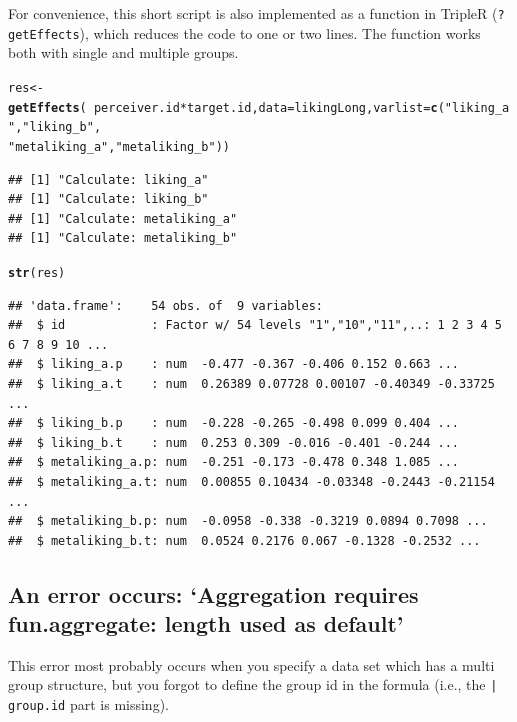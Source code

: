 \documentclass[a4paper]{article}\usepackage[]{graphicx}\usepackage[]{color}
\makeatletter
\newcommand{\hlstr}[1]{\textcolor[rgb]{0.192,0.494,0.8}{#1}}%
\newcommand{\hlopt}[1]{\textcolor[rgb]{0,0,0}{#1}}%
\newcommand{\hlstd}[1]{\textcolor[rgb]{0.345,0.345,0.345}{#1}}%
\newcommand{\hlkwb}[1]{\textcolor[rgb]{0.69,0.353,0.396}{#1}}%
\newcommand{\hlkwc}[1]{\textcolor[rgb]{0.333,0.667,0.333}{#1}}%
\newcommand{\hlkwd}[1]{\textcolor[rgb]{0.737,0.353,0.396}{\textbf{#1}}}%
\newenvironment{kframe}{%
 \def\at@end@of@kframe{}%
 \ifinner\ifhmode%
  \def\at@end@of@kframe{\end{minipage}}%
  \begin{minipage}{\columnwidth}%
 \fi\fi%
 \def\FrameCommand##1{\hskip\@totalleftmargin \hskip-\fboxsep
 \colorbox{shadecolor}{##1}\hskip-\fboxsep
     \hskip-\linewidth \hskip-\@totalleftmargin \hskip\columnwidth}%
 \MakeFramed {\advance\hsize-\width
   \@totalleftmargin\z@ \linewidth\hsize
   \@setminipage}}%
 {\par\unskip\endMakeFramed%
 \at@end@of@kframe}
\newenvironment{knitrout}{}{} %
\makeatother
\begin{document}
For convenience, this short script is also implemented as a function in TripleR (\texttt{?getEffects}), which reduces the code to one or two lines. The function works both with single and multiple groups.

\begin{knitrout}\small
{}\color{fgcolor}\begin{kframe}
\begin{alltt}
\hlstd{res} \hlkwb{<-} \hlkwd{getEffects}\hlstd{(}\hlopt{~}\hlstd{perceiver.id} \hlopt{*} \hlstd{target.id,} \hlkwc{data} \hlstd{= likingLong,} \hlkwc{varlist} \hlstd{=} \hlkwd{c}\hlstd{(}\hlstr{"liking_a"}\hlstd{,} \hlstr{"liking_b"}\hlstd{,}
    \hlstr{"metaliking_a"}\hlstd{,} \hlstr{"metaliking_b"}\hlstd{))}
\end{alltt}
\begin{verbatim}
## [1] "Calculate: liking_a"
## [1] "Calculate: liking_b"
## [1] "Calculate: metaliking_a"
## [1] "Calculate: metaliking_b"
\end{verbatim}
\begin{alltt}
\hlkwd{str}\hlstd{(res)}
\end{alltt}
\begin{verbatim}
## 'data.frame':	54 obs. of  9 variables:
##  $ id            : Factor w/ 54 levels "1","10","11",..: 1 2 3 4 5 6 7 8 9 10 ...
##  $ liking_a.p    : num  -0.477 -0.367 -0.406 0.152 0.663 ...
##  $ liking_a.t    : num  0.26389 0.07728 0.00107 -0.40349 -0.33725 ...
##  $ liking_b.p    : num  -0.228 -0.265 -0.498 0.099 0.404 ...
##  $ liking_b.t    : num  0.253 0.309 -0.016 -0.401 -0.244 ...
##  $ metaliking_a.p: num  -0.251 -0.173 -0.478 0.348 1.085 ...
##  $ metaliking_a.t: num  0.00855 0.10434 -0.03348 -0.2443 -0.21154 ...
##  $ metaliking_b.p: num  -0.0958 -0.338 -0.3219 0.0894 0.7098 ...
##  $ metaliking_b.t: num  0.0524 0.2176 0.067 -0.1328 -0.2532 ...
\end{verbatim}
\end{kframe}
\end{knitrout}







\subsection{An error occurs: `Aggregation requires fun.aggregate: length used as default'} %
\label{sub:an_error_occurs_aggregation_requires_fun_aggregate_length_used_as_default_}
This error most probably occurs when you specify a data set which has a multi group structure, but you forgot to define the group id in the formula (i.e., the \texttt{| group.id} part is missing).
\end{document}

